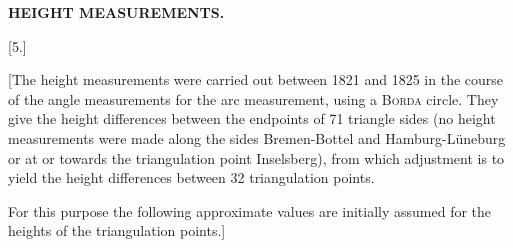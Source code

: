 \par\clearpage
\noindent\null\hfill{\small\textbf{HEIGHT MEASUREMENTS.}}\hfill{}\par\medskip
\begin{center}
[5.]\par{}
\end{center}
\par\noindent\hspace*{\parindent}[The height measurements were carried out between 1821 and 1825 in the course of the
angle measurements for the arc measurement, using a \textsc{Borda} circle.
They give the height differences between the endpoints of 71 triangle sides
(no height measurements were made along the sides Bremen-Bottel and Hamburg-Lüneburg or at or towards the triangulation point
Inselsberg), from which adjustment is to yield
the height differences between 32 triangulation points.
\par\noindent\hspace*{\parindent}For this purpose the following approximate values are initially assumed
for the heights of the triangulation points.]
\par\medskip
